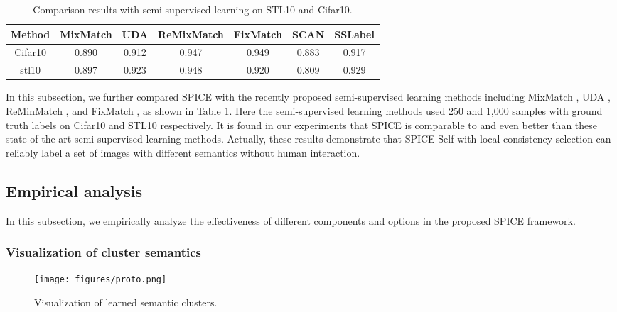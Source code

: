 \documentclass[10pt,twocolumn,letterpaper]{article}
\begin{document}
\begin{table}[ht]
\footnotesize
\renewcommand\tabcolsep{2.5pt}
\caption{ Comparison results with semi-supervised learning on STL10 and Cifar10.}
\label{table_results_semi}
\centering
\begin{tabular}{|c|cccc|cc|}

\hline

Method                          & MixMatch&UDA&ReMixMatch&FixMatch& SCAN & SSLabel\\

\hline\hline
Cifar10                         & 0.890 & 0.912 & 0.947 & 0.949 & 0.883 & 0.917   \\
\hline
stl10                           & 0.897 & 0.923 & 0.948  & 0.920 & 0.809 & 0.929   \\
\hline
\end{tabular}
\end{table}

In this subsection, we further compared SPICE with the recently proposed semi-supervised learning methods including MixMatch \cite{mixmatch}, UDA \cite{UDA}, ReMinMatch \cite{remixmatch}, and FixMatch \cite{fixmatch}, as shown in Table \ref{table_results_semi}. Here the semi-supervised learning methods used 250 and 1,000 samples with ground truth labels on Cifar10 and STL10 respectively. It is found in our experiments that SPICE is comparable to and even better than these state-of-the-art semi-supervised learning methods. Actually, these results demonstrate that SPICE-Self with local consistency selection can reliably label a set of images with different semantics without human interaction.

\subsection{Empirical analysis}

In this subsection, we empirically analyze the effectiveness of different components and options in the proposed SPICE framework. 

\subsubsection{Visualization of cluster semantics}

\begin{figure}[hbt!]
    \centering
    \texttt{[image: figures/proto.png]}
    \caption{Visualization of learned semantic clusters.}
    \label{fig_proto}
\end{figure}
\end{document}
